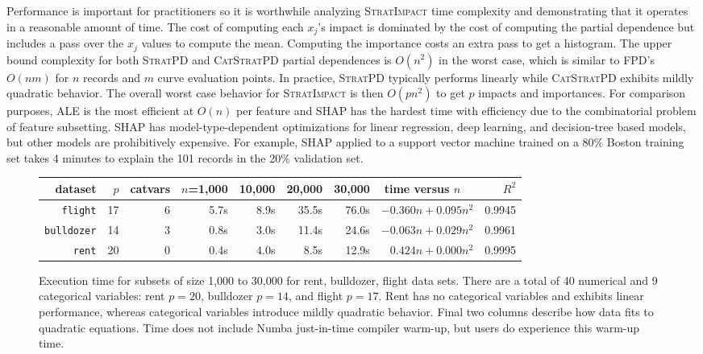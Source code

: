 \documentclass[11pt]{article}
\newcommand{\simp}{\fontfamily{cmr}\textsc{\small StratImpact}}
\newcommand{\spd}{\fontfamily{cmr}\textsc{\small StratPD}}
\newcommand{\cspd}{\fontfamily{cmr}\textsc{\small CatStratPD}}
\begin{document}
Performance is important for practitioners so it is worthwhile analyzing \simp{} time complexity and demonstrating that it operates in a reasonable amount of time.  The cost of computing each $x_j$'s impact is dominated by the cost of computing the partial dependence but includes a pass over the $x_j$ values to compute the mean. Computing the importance costs an extra pass to get a histogram. The upper bound  complexity for both \spd{} and \cspd{} partial dependences is $O(n^2)$ in the worst case, which is  similar to FPD's $O(nm)$ for $n$ records and $m$ curve evaluation points.  In practice, \spd{} typically performs linearly while \cspd{} exhibits mildly quadratic behavior.  The overall worst case behavior for \simp{} is then $O(p n^2)$ to get $p$ impacts and importances.   For comparison purposes, ALE is the most efficient at $O(n)$ per feature and SHAP has the hardest time with efficiency due to the combinatorial problem of feature subsetting. SHAP has model-type-dependent optimizations for linear regression, deep learning, and decision-tree based models, but other models are prohibitively expensive. For example, SHAP applied to a support vector machine trained on a 80\% Boston training set takes 4 minutes to explain the 101 records in the 20\% validation set.

\begin{figure}\small
\centering
\begin{tabular}{r r r r r r r r r}
{\bf dataset} & $p$ & catvars & {\small $n$=1,000} & {\small 10,000} & {\small 20,000} & {\small 30,000} & time versus $n$~~ & $R^2$\\
\hline
{\tt\small flight} & 17 & 6 & 5.7s & 8.9s & 35.5s & 76.0s & {\small $-0.360 n + 0.095 n^2$} & {\small 0.9945}\\
{\tt\small bulldozer} & 14 & 3 & 0.8s & 3.0s & 11.4s & 24.6s & {\small $-0.063 n + 0.029 n^2$} & {\small 0.9961}\\
{\tt\small rent} & 20 & 0 & 0.4s & 4.0s & 8.5s & 12.9s & {\small $0.424 n + 0.000 n^2$} & {\small 0.9995}\\
\end{tabular}
\vspace{-3mm}
\caption{\small  Execution time for subsets of size 1,000 to 30,000 for rent, bulldozer, flight data sets.  There are a total of 40 numerical and 9 categorical variables: rent $p=20$, bulldozer $p=14$, and flight $p=17$. 
Rent has no categorical variables and exhibits linear performance, whereas categorical variables introduce mildly quadratic behavior. Final two columns describe how data fits to quadratic equations. Time does not include Numba just-in-time compiler warm-up, but users do experience this warm-up time.}
\label{fig:timing}
\end{figure}
\end{document}
